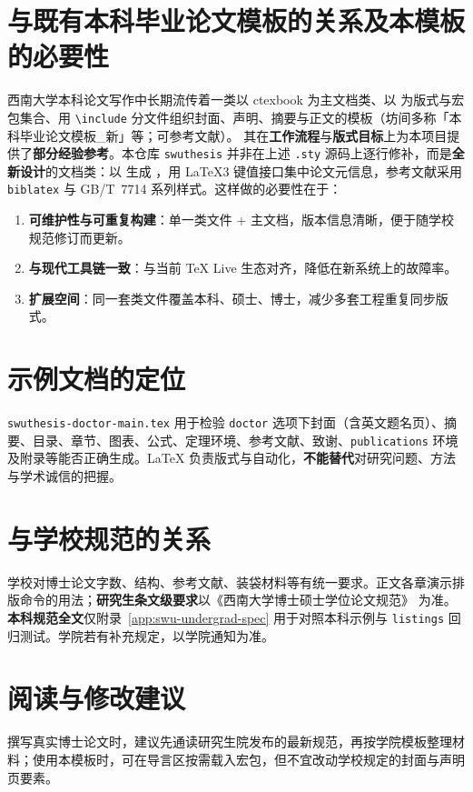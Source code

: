 \section{与既有本科毕业论文模板的关系及本模板的必要性}
西南大学本科论文写作中长期流传着一类以 \textsf{ctexbook} 为主文档类、以  为版式与宏包集合、用 \texttt{\textbackslash include} 分文件组织封面、声明、摘要与正文的模板（坊间多称「本科毕业论文模板\_新」等；可参考文献\cite{bao2024swuthesisLegacy}）。
其在\textbf{工作流程}与\textbf{版式目标}上为本项目提供了\textbf{部分经验参考}。本仓库 \texttt{swuthesis} 并非在上述 \texttt{.sty} 源码上逐行修补，而是\textbf{全新设计}的文档类：以  生成 ，用 \LaTeX3 键值接口集中论文元信息，参考文献采用 \texttt{biblatex} 与 GB/T~7714 系列样式。这样做的必要性在于：
\begin{enumerate}[label=\arabic*., leftmargin=2em]
  \item \textbf{可维护性与可重复构建}：单一类文件 + 主文档，版本信息清晰，便于随学校规范修订而更新。
  \item \textbf{与现代工具链一致}：与当前 \TeX{} Live 生态对齐，降低在新系统上的故障率。
  \item \textbf{扩展空间}：同一套类文件覆盖本科、硕士、博士，减少多套工程重复同步版式。
\end{enumerate}

\section{示例文档的定位}
\texttt{swuthesis-doctor-main.tex} 用于检验 \texttt{doctor} 选项下封面（含英文题名页）、摘要、目录、章节、图表、公式、定理环境、参考文献、致谢、\texttt{publications} 环境及附录等能否正确生成。\LaTeX{} 负责版式与自动化，\textbf{不能替代}对研究问题、方法与学术诚信的把握。

\section{与学校规范的关系}
学校对博士论文字数、结构、参考文献、装袋材料等有统一要求。正文各章演示排版命令的用法；\textbf{研究生条文级要求}以《西南大学博士硕士学位论文规范》\cite{swu2022gradThesisSpecDoc} 为准。\textbf{本科规范全文}仅附录~\ref{app:swu-undergrad-spec} 用于对照本科示例与 \texttt{listings} 回归测试。学院若有补充规定，以学院通知为准。

\section{阅读与修改建议}
撰写真实博士论文时，建议先通读研究生院发布的最新规范，再按学院模板整理材料；使用本模板时，可在导言区按需载入宏包，但不宜改动学校规定的封面与声明页要素。

